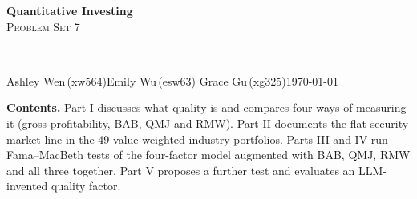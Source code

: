 \documentclass[11pt]{article}
\begin{document}
\thispagestyle{empty}
\begin{flushleft}
{\bfseries\LARGE\color{psink} Quantitative Investing}\\[3pt]
{\scshape\Large\color{psink} Problem Set 7}\\[10pt]
{\color{psrule}\rule{\textwidth}{1.2pt}}\\[5pt]
{\small Ashley Wen\,(xw564)\quad\textbar\quad Emily Wu\,(esw63)%
\quad\textbar\quad Grace Gu\,(xg325)\hfill \today}
\end{flushleft}

\vspace{1.4em}

{\color{psink}\textbf{Contents.}} Part I discusses what quality is and compares four ways of
measuring it (gross profitability, BAB, QMJ and RMW). Part II documents the flat security
market line in the 49 value-weighted industry portfolios. Parts III and IV run Fama--MacBeth
tests of the four-factor model augmented with BAB, QMJ, RMW and all three together. Part V
proposes a further test and evaluates an LLM-invented quality factor.

\vspace{0.8em}





\end{document}
